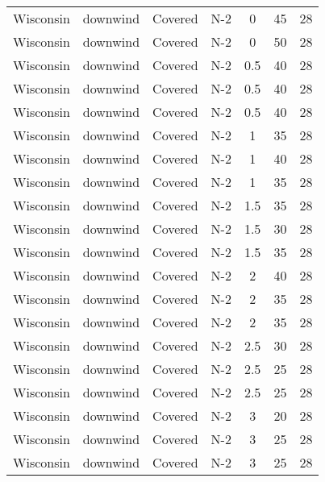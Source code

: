 \documentclass{article}
\begin{document}
\begin{longtable}[c]{ccccccc}
Wisconsin & downwind  & Covered     & N-2             & 0            & 45          & 28  \\
Wisconsin & downwind  & Covered     & N-2             & 0            & 50          & 28  \\
Wisconsin & downwind  & Covered     & N-2             & 0.5          & 40          & 28  \\
Wisconsin & downwind  & Covered     & N-2             & 0.5          & 40          & 28  \\
Wisconsin & downwind  & Covered     & N-2             & 0.5          & 40          & 28  \\
Wisconsin & downwind  & Covered     & N-2             & 1            & 35          & 28  \\
Wisconsin & downwind  & Covered     & N-2             & 1            & 40          & 28  \\
Wisconsin & downwind  & Covered     & N-2             & 1            & 35          & 28  \\
Wisconsin & downwind  & Covered     & N-2             & 1.5          & 35          & 28  \\
Wisconsin & downwind  & Covered     & N-2             & 1.5          & 30          & 28  \\
Wisconsin & downwind  & Covered     & N-2             & 1.5          & 35          & 28  \\
Wisconsin & downwind  & Covered     & N-2             & 2            & 40          & 28  \\
Wisconsin & downwind  & Covered     & N-2             & 2            & 35          & 28  \\
Wisconsin & downwind  & Covered     & N-2             & 2            & 35          & 28  \\
Wisconsin & downwind  & Covered     & N-2             & 2.5          & 30          & 28  \\
Wisconsin & downwind  & Covered     & N-2             & 2.5          & 25          & 28  \\
Wisconsin & downwind  & Covered     & N-2             & 2.5          & 25          & 28  \\
Wisconsin & downwind  & Covered     & N-2             & 3            & 20          & 28  \\
Wisconsin & downwind  & Covered     & N-2             & 3            & 25          & 28  \\
Wisconsin & downwind  & Covered     & N-2             & 3            & 25          & 28  \\

\end{longtable}
\end{document}
